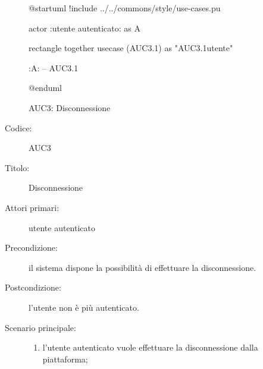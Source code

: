 \documentclass[../../../analisi-dei-requisiti.tex]{subfiles}
\begin{document}
\begin{figure}[H]
  \centering
  \begin{plantuml}
  @startuml
  !include ../../commons/style/use-cases.pu

  actor :utente autenticato: as A

  rectangle {
    together {
      usecase (AUC3.1) as "AUC3.1\nDisconnessione utente"
    }
  }

  :A: -- AUC3.1

  @enduml
  \end{plantuml}
  \caption{AUC3: Disconnessione}
  \label{fig:auc3}
\end{figure}

\begin{description}
  \item[Codice:] AUC3
  \item[Titolo:] Disconnessione
  \item[Attori primari:] utente autenticato
  \item[Precondizione:] il sistema dispone la possibilità di effettuare la disconnessione.
  \item[Postcondizione:] l'utente non è più autenticato.
  \item[Scenario principale:]
  \begin{enumerate}
    \item l'utente autenticato vuole effettuare la disconnessione dalla piattaforma;
  \end{enumerate}
\end{description}
\end{document}
